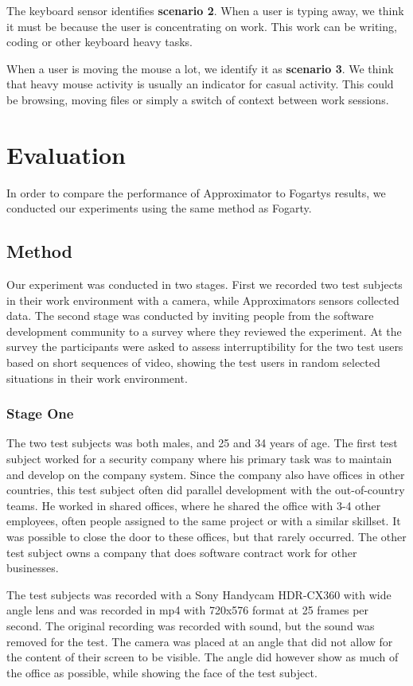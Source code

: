 \documentclass{sigchi}
\begin{document}
The keyboard sensor identifies \textbf{scenario 2}.
When a user is typing away, we think it must be because the user is concentrating on work.
This work can be writing, coding or other keyboard heavy tasks.

When a user is moving the mouse a lot, we identify it as \textbf{scenario 3}.
We think that heavy mouse activity is usually an indicator for casual activity.
This could be browsing, moving files or simply a switch of context between work sessions.

\section{Evaluation}
In order to compare the performance of Approximator to Fogartys results, we conducted our experiments using the same method as Fogarty.

\subsection{Method}
Our experiment was conducted in two stages.
First we recorded two test subjects in their work environment with a camera, while Approximators sensors collected data.
The second stage was conducted by inviting people from the software development community to a survey where they reviewed the experiment.
At the survey the participants were asked to assess interruptibility for the two test users based on short sequences of video, showing the test users in random selected situations in their work environment.

\subsubsection{Stage One}
The two test subjects was both males, and 25 and 34 years of age.
The first test subject worked for a security company where his primary task was to maintain and develop on the company system.
Since the company also have offices in other countries, this test subject often did parallel development with the out-of-country teams.
He worked in shared offices, where he shared the office with 3-4 other employees, often people assigned to the same project or with a similar skillset.
It was possible to close the door to these offices, but that rarely occurred.
The other test subject owns a company that does software contract work for other businesses.


The test subjects was recorded with a Sony Handycam HDR-CX360 with wide angle lens and was recorded in mp4 with 720x576 format at 25 frames per second.
The original recording was recorded with sound, but the sound was removed for the test.
The camera was placed at an angle that did not allow for the content of their screen to be visible.
The angle did however show as much of the office as possible, while showing the face of the test subject.
\end{document}
